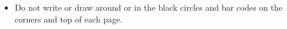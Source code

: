 \documentclass[letterpaper,10pt]{article}
\begin{document}
{\begin{itemize}	







\item Do not write or draw around or in the black circles and bar codes on the corners and top of each page.	




\end{itemize}	
















\clearpage	



}	
\end{document}
